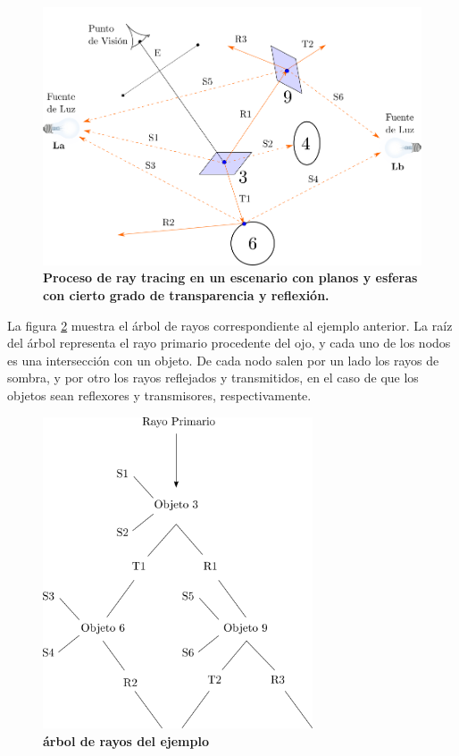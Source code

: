 \begin{figure}[h]
    \includegraphics[width=12cm]{Img/CPD/grafica13.png}
    \centering
    \caption{\textbf{\footnotesize{Proceso de ray tracing  en un escenario con planos y esferas con cierto grado de transparencia y reflexión. }}}
    \label{fig:grafica13}
\end{figure}

La figura \ref{fig:grafica14} muestra el árbol de rayos correspondiente al ejemplo anterior.
La raíz del árbol representa el rayo primario procedente del ojo, y cada uno de los nodos es una intersección con un objeto. De cada nodo salen por un lado los rayos de sombra, y por otro los rayos reflejados y transmitidos, en el caso de que los objetos sean reflexores y transmisores, respectivamente.

\begin{figure}[h]
    \includegraphics[width=8cm]{Img/CPD/grafica14.png}
    \centering
    \caption{\textbf{\footnotesize{   árbol de rayos del ejemplo }}}
    \label{fig:grafica14}
\end{figure}

